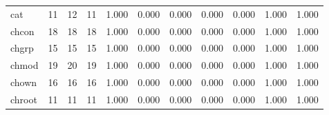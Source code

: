 \begin{longtable}{lp{1.8cm}p{1.8cm}p{1.8cm}p{1.8cm}p{1.8cm}p{1.8cm}p{1.8cm}p{1.8cm}p{1.8cm}p{1.8cm}}
cat       &                           11 &                 12 &                                11 &                                      1.000 &                                  0.000 &                                        0.000 &                             0.000 &                                   0.000 &                              1.000 &                                              1.000 \\
chcon     &                           18 &                 18 &                                18 &                                      1.000 &                                  0.000 &                                        0.000 &                             0.000 &                                   0.000 &                              1.000 &                                              1.000 \\
chgrp     &                           15 &                 15 &                                15 &                                      1.000 &                                  0.000 &                                        0.000 &                             0.000 &                                   0.000 &                              1.000 &                                              1.000 \\
chmod     &                           19 &                 20 &                                19 &                                      1.000 &                                  0.000 &                                        0.000 &                             0.000 &                                   0.000 &                              1.000 &                                              1.000 \\
chown     &                           16 &                 16 &                                16 &                                      1.000 &                                  0.000 &                                        0.000 &                             0.000 &                                   0.000 &                              1.000 &                                              1.000 \\
chroot    &                           11 &                 11 &                                11 &                                      1.000 &                                  0.000 &                                        0.000 &                             0.000 &                                   0.000 &                              1.000 &                                              1.000 \\

\end{longtable}
